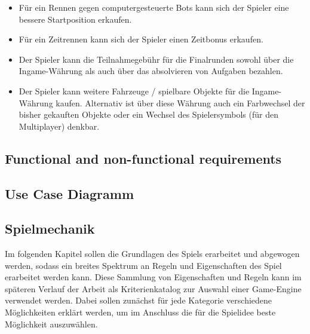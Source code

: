 \begin{enumerate}
		\begin{itemize}
			\item{Für ein Rennen gegen computergesteuerte Bots kann sich der Spieler eine bessere Startposition erkaufen.}
			\item{Für ein Zeitrennen kann sich der Spieler einen Zeitbonus erkaufen.}
			\item{Der Spieler kann die Teilnahmegebühr für die Finalrunden sowohl über die Ingame-Währung als auch über das absolvieren von Aufgaben bezahlen.}
			\item{Der Spieler kann weitere Fahrzeuge / spielbare Objekte für die Ingame-Währung kaufen. Alternativ ist über diese Währung auch ein Farbwechsel der bisher gekauften Objekte oder ein Wechsel des Spielersymbols (für den Multiplayer) denkbar.}
		\end{itemize}
	\end{enumerate}

\subsection{Functional and non-functional requirements}
\subsection{Use Case Diagramm}

\subsection{Spielmechanik}
	Im folgenden Kapitel sollen die Grundlagen des Spiels erarbeitet und abgewogen werden, sodass ein breites Spektrum an Regeln und Eigenschaften des Spiel erarbeitet werden kann. Diese Sammlung von Eigenschaften und Regeln kann im späteren Verlauf der Arbeit als Kriterienkatalog zur Auswahl einer Game-Engine verwendet werden. Dabei sollen zunächst für jede Kategorie verschiedene Möglichkeiten erklärt werden, um im Anschluss die für die Spielidee beste Möglichkeit auszuwählen.

